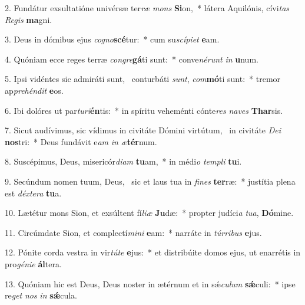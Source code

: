 2. Fundátur exsultatióne univérsæ ter\textit{ræ} \textit{mons} \textbf{Si}on,~*  látera Aquilónis, cívi\textit{tas} \textit{Re}\textit{gis} \textbf{ma}gni.\

3. Deus in dómibus ejus \textit{co}\textit{gno}\textbf{scé}tur:~*  cum su\textit{scí}\textit{pi}\textit{et} \textbf{e}am.\

4. Quóniam ecce reges terræ \textit{con}\textit{gre}\textbf{gá}ti sunt:~*  conve\textit{né}\textit{runt} \textit{in} \textbf{u}num.\

5. Ipsi vidéntes sic admiráti sunt, \dag\  conturbáti \textit{sunt}, \textit{com}\textbf{mó}ti sunt:~*  tremor ap\textit{pre}\textit{hén}\textit{dit} \textbf{e}os.\

6. Ibi dolóres ut par\textit{tu}\textit{ri}\textbf{én}tis:~*  in spíritu veheménti cónte\textit{res} \textit{na}\textit{ves} \textbf{Thar}sis.\

7. Sicut audívimus, sic vídimus in civitáte Dómini virtútum, \dag\  in civitáte \textit{De}\textit{i} \textbf{nos}tri:~*  Deus fundávit e\textit{am} \textit{in} \textit{æ}\textbf{tér}num.\

8. Suscépimus, Deus, misericór\textit{di}\textit{am} \textbf{tu}am,~*  in médi\textit{o} \textit{tem}\textit{pli} \textbf{tu}i.\

9. Secúndum nomen tuum, Deus, \dag\  sic et laus tua in \textit{fi}\textit{nes} \textbf{ter}ræ:~*  justítia plena est \textit{déx}\textit{te}\textit{ra} \textbf{tu}a.\

10. Lætétur mons Sion, et exsúltent fí\textit{li}\textit{æ} \textbf{Ju}dæ:~*  propter judíci\textit{a} \textit{tu}\textit{a}, \textbf{Dó}mine.\

11. Circúmdate Sion, et complectí\textit{mi}\textit{ni} \textbf{e}am:~*  narráte in \textit{túr}\textit{ri}\textit{bus} \textbf{e}jus.\

12. Pónite corda vestra in vir\textit{tú}\textit{te} \textbf{e}jus:~*  et distribúite domos ejus, ut enarrétis in pro\textit{gé}\textit{ni}\textit{e} \textbf{ál}tera.\

13. Quóniam hic est Deus, Deus noster in ætérnum et in sǽ\textit{cu}\textit{lum} \textbf{sǽ}culi:~*  ipse re\textit{get} \textit{nos} \textit{in} \textbf{sǽ}cula.\


